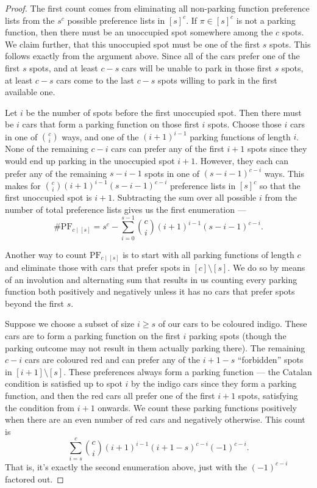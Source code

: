 \documentclass[12 pt]{amsart}
\theoremstyle{definition} %
\theoremstyle{remark} %
\begin{document}
\begin{proof}
	The first count comes from eliminating all non-parking function preference lists from the $s^{c}$ possible preference lists in $[s]^{c}$. If $\pi \in [s]^{c}$ is not a parking function, then there must be an unoccupied spot somewhere among the $c$ spots. We claim further, that this unoccupied spot must be one of the first $s$ spots. This follows exactly from the argument above. Since all of the cars prefer one of the first $s$ spots, and at least $c - s$ cars will be unable to park in those first $s$ spots, at least $c - s$ cars come to the last $c - s$ spots willing to park in the first available one.

	Let $i$ be the number of spots before the first unoccupied spot. Then there must be $i$ cars that form a parking function on those first $i$ spots. Choose those $i$ cars in one of $\binom{c}{i}$ ways, and one of the $(i + 1)^{i - 1}$ parking functions of length $i$. None of the remaining $c - i$ cars can prefer any of the first $i + 1$ spots since they would end up parking in the unoccupied spot $i + 1$. However, they each can prefer any of the remaining $s - i - 1$ spots in one of $(s - i - 1)^{c - i}$ ways. This makes for $\binom{c}{i} (i + 1)^{i - 1}(s - i - 1)^{c - i}$ preference lists in $[s]^{c}$ so that the first unoccupied spot is $i + 1$. Subtracting the sum over all possible $i$ from the number of total preference lists gives us the first enumeration ---
	\[
		\# \mathrm{PF}_{c \mid [s]} = s^{c} - \sum_{i = 0}^{s - 1} \binom{c}{i} (i + 1)^{i - 1} (s - i - 1)^{c - i}.
	\]

	Another way to count $\mathrm{PF}_{c \mid [s]}$ is to start with all parking functions of length $c$ and eliminate those with cars that prefer spots in $[c] \setminus [s]$. We do so by means of an involution and alternating sum that results in us counting every parking function both positively and negatively unless it has no cars that prefer spots beyond the first $s$.

	Suppose we choose a subset of size $i \ge s$ of our cars to be coloured indigo. These cars are to form a parking function on the first $i$ parking spots (though the parking outcome may not result in them actually parking there). The remaining $c - i$ cars are coloured red and can prefer any of the $i + 1 - s$ ``forbidden'' spots in  $[i + 1] \setminus [s]$. These preferences always form a parking function --- the Catalan condition is satisfied up to spot $i$ by the indigo cars since they form a parking function, and then the red cars all prefer one of the first $i + 1$ spots, satisfying the condition from $i+1$ onwards. We count these parking functions positively when there are an even number of red cars and negatively otherwise. This count is
	\[
		\sum_{i = s}^{c} \binom{c}{i} (i + 1)^{i - 1} (i + 1 - s)^{c - i} (-1)^{c - i}.
	\]
	That is, it's exactly the second enumeration above, just with the $(-1)^{c - i}$ factored out.


\end{proof}
\end{document}
